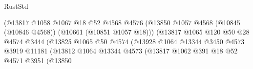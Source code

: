 \begin{lexlean}{RustStd}
\begin{coremodule}
                                                  (@13817
                                                    @1058
                                                    @1067
                                                    @18
                                                    @52
                                                    @4568
                                                    @4576
                                                    (@13850
                                                      @1057
                                                      @4568
                                                      (@10845 (@10846 @4568))
                                                      (@10661 (@10851 @1057 @18)))
                                                    (@13817
                                                      @1065
                                                      @120
                                                      @50
                                                      @28
                                                      @4574
                                                      @3444
                                                      (@13825
                                                        @1065
                                                        @50
                                                        @4574
                                                        (@13928
                                                          @1064
                                                          @13344
                                                          @3450
                                                          @4573
                                                          @3919
                                                          @11181
                                                          (@13812
                                                            @1064
                                                            @13344
                                                            @4573
                                                            (@13817
                                                              @1062
                                                              @391
                                                              @18
                                                              @52
                                                              @4571
                                                              @3951
                                                              (@13850

\end{coremodule}
\end{lexlean}
